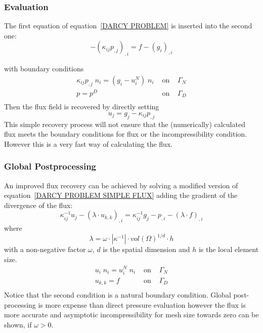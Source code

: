 \subsubsection{Evaluation}\label{SEC DARCY SIMPLE}
The first equation of equation~\ref{DARCY PROBLEM} is inserted into the second one:
\begin{equation}\label{DARCY PROBLEM SIMPLE}
- (\kappa_{ij} p_{,j})_{,i}  =  f  - (g_{i})_{,i}
\end{equation} 

with boundary conditions
\begin{equation}\label{DARCY BOUNDARY SIMPLE}
\begin{array}{rcl}
\kappa_{ij} p_{,j} \; n_{i}  = ( g_{i} - u^{N}_{i} )  \; n_{i} & \mbox{ on } & \Gamma_{N} \\
p = p^{D} &  \mbox{ on } & \Gamma_{D} \\ 
\end{array}
\end{equation} 
Then the flux field is recovered by directly setting
\begin{equation}\label{DARCY PROBLEM SIMPLE FLUX}
 u_{j} = g_j -  \kappa_{ij} p_{,j}  
\end{equation} 
This simple recovery process will not ensure that the (numerically) calculated flux
meets the boundary conditions for flux or the incompressibility condition. 
However this is a very fast way of calculating the flux.


\subsubsection{Global Postprocessing \label{SEC DARCY POST}}
An improved flux recovery can be achieved by solving a modified version of equation~\ref{DARCY PROBLEM SIMPLE FLUX}
adding the gradient of the divergence of the flux:
\begin{equation}\label{DARCY PROBLEM POST FLUX}
\kappa^{-1}_{ij} u_{j} - 
(\lambda \cdot u_{k,k} )_{,i}= 
\kappa^{-1}_{ij} g_j- p_{,i} 
- (\lambda \cdot f )_{,i} 
\end{equation} 
where
\begin{equation}\label{DARCY PROBLEM POST FLUX A}
\lambda = \omega \cdot |\kappa^{-1}| \cdot vol(\Omega)^{1/d} \cdot h 
\end{equation} 
with a non-negative factor $\omega$, $d$ is the spatial dimension and $h$ is the local element size.
\begin{equation}\label{DARCY PROBLEM POST FLUX BOUNDARY}
\begin{array}{rcl}
u_{i} \; n_{i}  = u^{N}_{i}  \; n_{i} & \mbox{ on } & \Gamma_{N} \\
u_{k,k} = f & \mbox{ on } & \Gamma_{D} \\ 
\end{array}
\end{equation}   
Notice that the second condition is a natural boundary condition.
Global post-processing is more expense than direct pressure evaluation
however the flux is more accurate and asymptotic incompressibility
for mesh size towards zero can be shown, if $\omega>0$.


